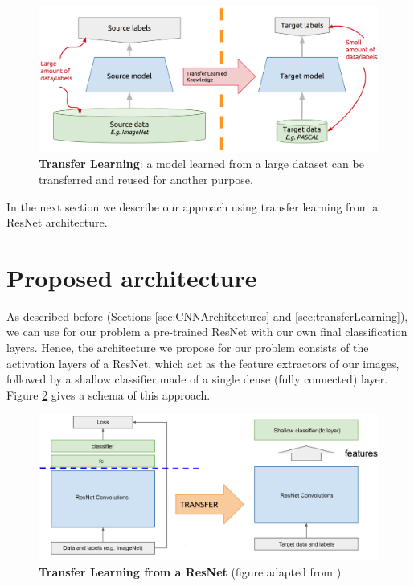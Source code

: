 \begin{figure}[h!]
	\centering
	\captionsetup{width=1\linewidth}
	\includegraphics[width=1\textwidth]{Figures/transfer_learning_idea.png}
	\caption{\textbf{Transfer Learning}: a model learned from a large dataset can be transferred and reused for another purpose. \parencite{McGuinness2017}}
	\label{fig:transfer_learning_idea}
\end{figure}

In the next section we describe our approach using transfer learning from a ResNet architecture.


\section{Proposed architecture}\label{sec:dl_architecture}

As described before (Sections \ref{sec:CNNArchitectures} and \ref{sec:transferLearning}), we can use for our problem a pre-trained ResNet with our own final classification layers. Hence, the architecture we propose for our problem consists of the activation layers of a ResNet, which act as the feature extractors of our images, followed by a shallow classifier made of a single dense (fully connected) layer. Figure \ref{fig:transfer_learning} gives a schema of this approach.

\begin{figure}[h!]
	\centering
	\captionsetup{width=1\linewidth}
	\includegraphics[width=1\textwidth]{Figures/transfer_learning.png}
	\caption{\textbf{Transfer Learning from a ResNet} (figure adapted from \parencite{McGuinness2017})}
	\label{fig:transfer_learning}
\end{figure}

